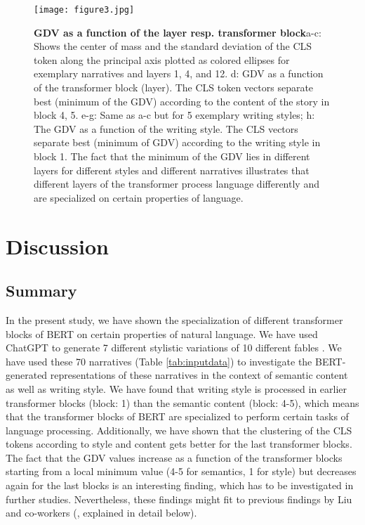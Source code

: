 \begin{figure}[h!]
    \centering
    \texttt{[image: figure3.jpg]}
    \caption{\textbf{GDV as a function of the layer resp. transformer block}\newline a-c: Shows the center of mass and the standard deviation of the CLS token along the principal axis plotted as colored ellipses for exemplary narratives and layers 1, 4, and 12. d: GDV as a function of the transformer block (layer). The CLS token vectors separate best (minimum of the GDV) according to the content of the story in block 4, 5. e-g: Same as a-c but for 5 exemplary writing styles; h: The GDV as a function of the writing style. The CLS vectors separate best (minimum of GDV) according to the writing style in block 1. The fact that the minimum of the GDV lies in different layers for different styles and different narratives illustrates that different layers of the transformer process language differently and are specialized on certain properties of language.}
    \label{fig:GDV}
\end{figure}


\section*{Discussion}
\subsection*{Summary}
In the present study, we have shown the specialization of different transformer blocks of BERT \cite{devlin2018bert} on certain properties of natural language. We have used ChatGPT \cite{radford2019language} to generate 7 different stylistic variations of 10 different fables \cite{1834aesop}. We have used these 70 narratives (Table \ref{tab:inputdata}) to investigate the BERT-generated representations of these narratives in the context of semantic content as well as writing style. We have found that writing style is processed in earlier transformer blocks (block: 1) than the semantic content (block: 4-5), which means that the transformer blocks of BERT are specialized to perform certain tasks of language processing. Additionally, we have shown that the clustering of the CLS tokens according to style and content gets better for the last transformer blocks.
The fact that the GDV values increase as a function of the transformer blocks starting from a local minimum value (4-5 for semantics, 1 for style) but decreases again for the last blocks is an interesting finding, which has to be investigated in further studies. Nevertheless, these findings might fit to previous findings by Liu and co-workers (\cite{liu2019linguistic}, explained in detail below).

